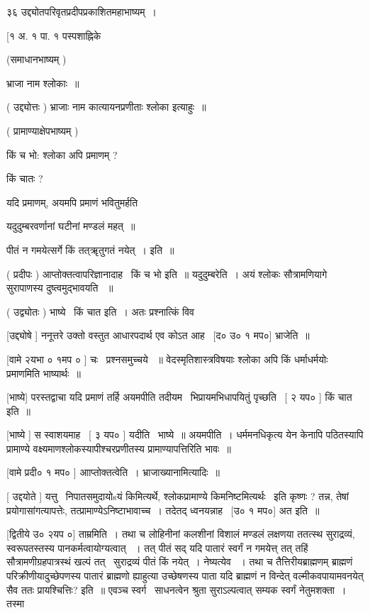 \documentclass[11pt, openany]{book}
\begin{document}
३६ उद्द्योतपरिवृतप्रदीपप्रकाशितमहाभाष्यम्~। 

 [१ अ. १ पा. १ पस्पशाह्निके



 (समाधानभाष्यम् ) 

भ्राजा नाम श्लोकाः~॥ 

 ( उद्द्योत्तः ) {\qt भ्राजाः नाम कात्यायनप्रणीताः श्लोका इत्याहुः~॥}

 ( प्रामाण्याक्षेपभाष्यम् ) 

किं च भो: श्लोका अपि प्रमाणम् ? 

किं चातः ? 

यदि प्रमाणम्, अयमपि प्रमाणं भवितुमर्हति \textendash\ 

यदुदुम्बरवर्णानां घटीनां मण्डलं महत्~॥ 

पीतं न गमयेत्सर्गे किं तत्ॠतुगतं नयेत्~।  इति~॥ 

 ( प्रदीपः ) आप्तोक्तत्वापरिज्ञानादाह \textendash\ किं च भो इति~॥
यदुदुम्बरेति~। अयं श्लोकः सौत्रामणियागे सुरापाणस्य दुष्त्वमुद्भावयति
~॥ 

 ( उद्व्योतः ) भाष्ये \textendash\ किं चात इति~। अतः प्रश्नात्किं विव \textendash\ 



 [उद्द्योषे ] ननूत्तरे उक्तो वस्तुत आधारपदार्थ एव कोऽत
आह \textendash\ [द० उ० १ मप०] भ्राजेति~॥ 

 [वामे २यभा ० १मप ० ] चः \textendash\ प्रश्नसमुच्चये ~॥ वेदस्मृतिशास्त्रविषयाः
श्लोका अपि किं धर्माधर्मयोः प्रमाणमिति भाष्यार्थः~॥ 

 [भाष्ये] परस्तद्वाचा {\qt यदि प्रमाणं तर्हि अयमपीति} तदीयम \textendash\ 
भिप्रायमभिधापयितुं पृच्छति \textendash\ [ २ यप० ] किं चात इति~॥ 

 [भाष्ये ] स स्वाशयमाह \textendash\ [ ३ यप० ] यदीति \textendash\ भाष्ये~॥ अयमपीति~। 
धर्ममनधिकृत्य येन केनापि पठितस्यापि प्रामाण्ये
वक्ष्यमाणश्लोकस्यापीश्चरप्रणीतस्य प्रामाण्यापत्तिरिति भावः~॥ 

 [वामे प्रदी० १ मप० ] आाप्तोक्तत्वेति~। भ्राजाख्यानामित्यादिः~॥ 

 [ उद्दयोते ] यत्तु \textendash\ निपातसमुदायोsयं किमित्यर्थे, श्लोकप्रामाण्ये
किमनिष्टमित्यर्थः \textendash\ इति कृष्णः ? तन्न, तेषां प्रयोगासांगत्यापत्तेः,
तत्प्रामाण्येऽनिष्टाभावाच्च~। तदेतद् ध्वनयन्नाह \textendash\ [उ० १ मप०] अत
इति~॥ 

 [द्वितीये उ० २यप ०] ताम्रमिति~। तथा च लोहिनीनां कलशीनां विशालं
मण्डलं लक्षणया ततत्स्थ सुराद्रव्यं, स्वरूपतस्तस्य पानकर्मत्वायोग्यत्वात्
~। तत् पीतं सद् यदि पातारं स्वर्गं न गमयेत्त् तत् तहिं
सौत्रामणीग्रहपात्रस्थं खल्पं तत् \textendash\ सुराद्रव्यं पीतं किं नयेत्~। नेष्यत्येव
~। तथा च तैत्तिरीयब्राह्मणम् ब्राह्मणं परिक्रीणीयादुच्छेपणस्य पातारं
ब्राह्मणो ह्याहुत्या उच्छेषणस्य पाता यदि ब्राह्मणं न विन्देत्
वल्मीकवपायामवनयेत् सैव ततः प्रायश्चित्तिः? इति~॥ एवञ्च स्वर्ग \textendash\ 
साधनत्वेन श्रुता सुराऽल्पत्वात् सम्यक स्वर्गं नेतुमशक्ता~। तस्मा \textendash\ 
\end{document}

